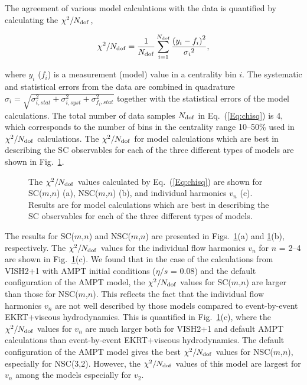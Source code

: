 The agreement of various model calculations with the data is quantified by calculating the $\chi^2/N_{\rm dof}$,

\begin{equation}
\chi^2/N_{\rm dof} = \frac{1}{N_{\rm dof}} \sum_{i=1}^{N_{\rm dof}} \frac{{(y_i-f_i)}^{2}}{{\sigma_i}^{2}},
\label{Eq:chisq}
\end{equation}

where $y_i$ ($f_i$) is a measurement (model) value in a centrality bin $i$. The systematic and statistical errors from the data are combined in quadrature $\sigma_i = \sqrt{\sigma_{i, stat}^2 + \sigma_{i, syst}^2 + \sigma_{f_i, stat}^2}$ together with the statistical errors of the model calculations.
The total number of data samples $N_{\rm dof}$ in Eq.~(\ref{Eq:chisq}) is 4, which corresponds to the number of bins in the centrality range 10--50\% used in $\chi^2/N_{\rm dof}$ calculations.
The $\chi^2/N_{\rm dof}$ for model calculations which are best in describing the SC observables for each of the three different types of models are shown in Fig.~\ref{fig:Figure_7}.

\begin{figure}[t!]
            \begin{center}
        \caption{The $\chi^2/N_{\rm dof}$ values calculated by Eq.~(\ref{Eq:chisq}) are shown for SC($m$,$n$) (a), NSC($m$,$n$) (b), and individual harmonics $v_n$ (c). Results are for model calculations which are best in describing the SC observables for each of the three different types of models.}
        \label{fig:Figure_7}
              \end{center}
\end{figure}
The results for SC($m$,$n$) and NSC($m$,$n$) are presented in Figs.~\ref{fig:Figure_7}(a) and \ref{fig:Figure_7}(b), respectively. The $\chi^2/N_{\rm dof}$ values for the individual flow harmonics $v_n$ for $n$ = 2--4 are shown in Fig.~\ref{fig:Figure_7}(c). We found that in the case of the calculations from VISH2+1 with AMPT initial conditions ($\eta/s$ = 0.08) and the default configuration of the AMPT model, the $\chi^2/N_{\rm dof}$ values for SC($m$,$n$) are larger than those for NSC($m$,$n$). This reflects the fact that the individual flow harmonics $v_n$ are not well described by those models compared to event-by-event EKRT+viscous hydrodynamics. This is quantified in Fig.~\ref{fig:Figure_7}(c), where the $\chi^2/N_{\rm dof}$ values for $v_n$ are much larger both for VISH2+1 and default AMPT calculations than event-by-event EKRT+viscous hydrodynamics.
The default configuration of the AMPT model gives the best $\chi^2/N_{\rm dof}$ values for NSC($m$,$n$), especially for NSC(3,2). However, the $\chi^2/N_{\rm dof}$ values of this model are largest for $v_n$ among the models especially for $v_2$.

